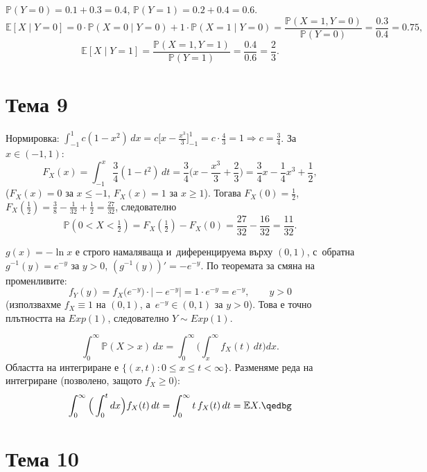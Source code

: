 \begin{proofbox}
$\mathbb P(Y=0)=0.1+0.3=0.4$, $\mathbb P(Y=1)=0.2+0.4=0.6$.
\[
  \mathbb E[X\mid Y=0] = 0\cdot\mathbb P(X=0\mid Y=0) + 1\cdot
  \mathbb P(X=1\mid Y=0) = \frac{\mathbb P(X=1,Y=0)}{\mathbb P(Y=0)}
  = \frac{0.3}{0.4} = 0.75,
\]
\[
  \mathbb E[X\mid Y=1] = \frac{\mathbb P(X=1,Y=1)}{\mathbb P(Y=1)} =
  \frac{0.4}{0.6} = \frac23.
\]
\end{proofbox}

\section*{Тема 9}

\begin{proofbox}
Нормировка: $\int_{-1}^1 c(1-x^2)\,dx = c\big[x-\tfrac{x^3}3\big]_{-1}
^1 = c\cdot\tfrac43=1 \Rightarrow c=\tfrac34$. За $x\in(-1,1)$:
\[
  F_X(x) = \int_{-1}^x \frac34(1-t^2)\,dt = \frac34\Big(x-\frac{x^3}
  3+\frac23\Big) = \frac34x-\frac14x^3+\frac12,
\]
($F_X(x)=0$ за $x\le-1$, $F_X(x)=1$ за $x\ge1$). Тогава $F_X(0)=
\tfrac12$, $F_X(\tfrac12)=\tfrac38-\tfrac1{32}+\tfrac12=\tfrac{27}
{32}$, следователно
\[
  \mathbb P(0<X<\tfrac12) = F_X(\tfrac12)-F_X(0) = \frac{27}{32}-
  \frac{16}{32} = \frac{11}{32}.
\]
\end{proofbox}

\begin{proofbox}
$g(x)=-\ln x$ е строго намаляваща и~диференцируема върху $(0,1)$, с~обратна $g^{-1}(y)=e^{-y}$ за $y>0$, $(g^{-1}(y))'=-e^{-y}$. По
теоремата за смяна на променливите:
\[
  f_Y(y) = f_X\big(e^{-y}\big)\cdot\big|-e^{-y}\big| = 1\cdot e^{-y}
  = e^{-y}, \qquad y>0
\]
(използвахме $f_X\equiv1$ на $(0,1)$, а~$e^{-y}\in(0,1)$ за $y>0$).
Това е точно плътността на $Exp(1)$, следователно $Y\sim Exp(1)$.
\qedbg
\end{proofbox}

\begin{proofbox}
\[
  \int_0^{\infty} \mathbb P(X>x)\,dx = \int_0^{\infty}\Big(\int_x^{
  \infty} f_X(t)\,dt\Big)dx.
\]
Областта на интегриране е $\{(x,t): 0\le x\le t<\infty\}$.
Разменяме реда на интегриране (позволено, защото $f_X\ge0$):
\[
  \int_0^{\infty}\Big(\int_0^t dx\Big) f_X(t)\,dt = \int_0^{\infty}
  t\,f_X(t)\,dt = \mathbb EX. \qedbg
\]
\end{proofbox}

\section*{Тема 10}

